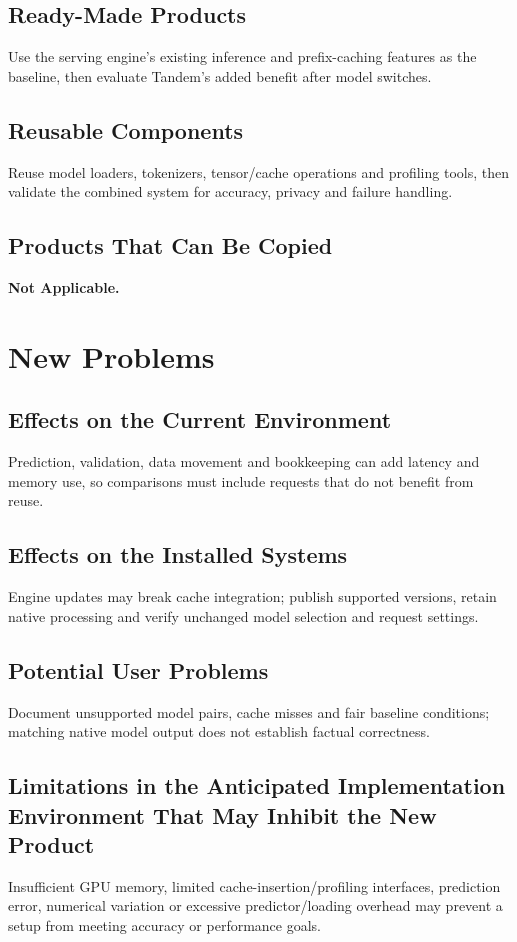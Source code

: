 \documentclass[12pt]{article}
\begin{document}
\subsection{Ready-Made Products}
Use the serving engine's existing inference and prefix-caching features as
the baseline, then evaluate Tandem's added benefit after model switches.


\subsection{Reusable Components}
Reuse model loaders, tokenizers, tensor/cache operations and profiling tools,
then validate the combined system for accuracy, privacy and failure handling.


\subsection{Products That Can Be Copied}
\textbf{Not Applicable.}


\section{New Problems}


\subsection{Effects on the Current Environment}
Prediction, validation, data movement and bookkeeping can add latency and
memory use, so comparisons must include requests that do not benefit from reuse.


\subsection{Effects on the Installed Systems}
Engine updates may break cache integration; publish supported versions,
retain native processing and verify unchanged model selection and request settings.


\subsection{Potential User Problems}
Document unsupported model pairs, cache misses and fair baseline conditions;
matching native model output does not establish factual correctness.


\subsection{Limitations in the Anticipated Implementation Environment That May
Inhibit the New Product}
Insufficient GPU memory, limited cache-insertion/profiling interfaces,
prediction error, numerical variation or excessive predictor/loading overhead
may prevent a setup from meeting accuracy or performance goals.
\end{document}
